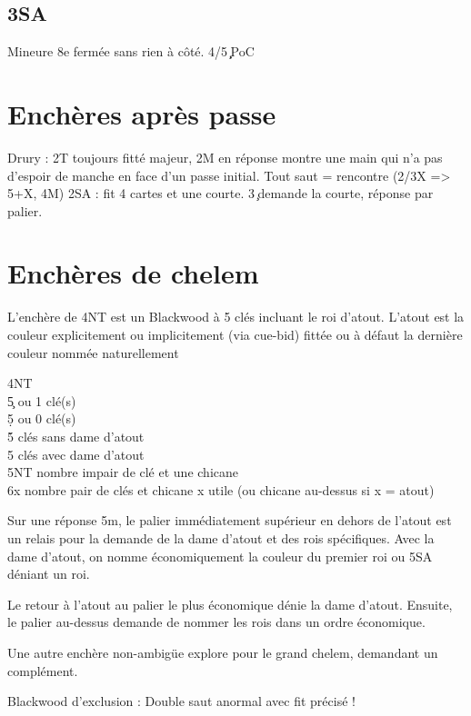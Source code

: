 \documentclass[a4paper]{article}
\begin{document}
\subsection{3SA}

Mineure 8e fermée sans rien à côté. 
4/5\c \d\ PoC

\section{Enchères après passe}

Drury : 2T toujours fitté majeur, 2M en réponse montre une main qui n'a pas d'espoir de manche en face d'un passe initial.
Tout saut = rencontre (2/3X => 5+X, 4M)
2SA : fit 4 cartes et une courte. 3\c\ demande la courte, réponse par palier.

\section{Enchères de chelem}

L'enchère de 4NT est un Blackwood à 5 clés incluant le roi d'atout. L'atout est la couleur explicitement ou implicitement (via cue-bid) fittée ou à défaut la dernière couleur nommée naturellement

\begin{bidtable}
4NT\+\\
5\c {} ou 1 clé(s)\\
5\d {} ou 0 clé(s)\\
5\h {} clés sans dame d'atout\\
5\s {} clés avec dame d'atout\\
5NT \> nombre impair de clé et une chicane\\
6x \> nombre pair de clés et chicane x utile (ou chicane au-dessus si x = atout)\-
\end{bidtable}

Sur une réponse 5m, le palier immédiatement supérieur en dehors de l'atout est un relais pour la demande de la dame d'atout et des rois spécifiques.
Avec la dame d'atout, on nomme économiquement la couleur du premier roi ou 5SA déniant un roi.

Le retour à l'atout au palier le plus économique dénie la dame d'atout. Ensuite, le palier au-dessus demande de nommer les rois dans un ordre économique.

Une autre enchère non-ambigüe explore pour le grand chelem, demandant un complément.

Blackwood d'exclusion : Double saut anormal avec fit précisé !
\end{document}
